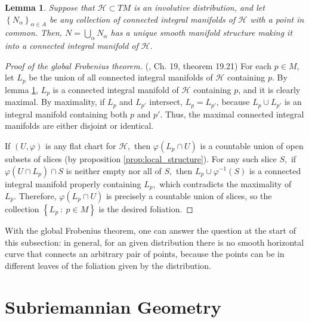 \documentclass[12pt, letterpaper, reqno]{amsart}
\theoremstyle{definition}
\theoremstyle{plain}
\newtheorem{lm}{Lemma}
\theoremstyle{remark}
\begin{document}
\begin{lm}\label{lm:man_struct}
	Suppose that $ \mathcal{H}\subset TM $ is an involutive distribution, and let $ \left\{ N_\alpha \right\}_{\alpha\in A} $ be any collection of connected integral manifolds of $ \mathcal{H} $ with a point in common. Then, $ N=\bigcup_{\alpha} N_\alpha $ has a unique smooth manifold structure making it into a connected integral manifold of $ \mathcal{H}. $  
\end{lm}

\begin{proof}[Proof of the global Frobenius theorem]
	(\cite{lee2003introduction}, Ch. 19, theorem 19.21) For each $ p\in M $, let $ L_p $ be the union of all connected integral manifolds of $ \mathcal{H} $ containing $ p. $ By lemma \ref{lm:man_struct}, $ L_p $ is a connected integral manifold of $ \mathcal{H} $ containing $ p $, and it is clearly maximal. By maximality, if $ L_p $ and $ L_{p'} $ intersect, $ L_p=L_{p'} $, because $ L_p\cup L_{p'} $ is an integral manifold containing both $ p $ and $ p' $. Thus, the maximal connected integral manifolds are either disjoint or identical.    

	If $ (U,\varphi) $ is any flat chart for $ \mathcal{H}, $ then $ \varphi(L_p\cap U) $ is a countable union of open subsets of slices (by proposition \ref{prop:local_structure}). For any such slice $ S, $ if $ \varphi(U\cap L_p)\cap S $ is neither empty nor all of $ S, $ then $ L_p\cup \varphi^{-1}(S )$ is a connected integral manifold properly containing $ L_p, $ which contradicts the maximality of $ L_p. $ Therefore, $ \varphi(L_p\cap U) $ is precisely a countable union of slices, so the collection $ \left\{ L_p\ : \ p\in M \right\} $ is the desired foliation.
\end{proof}

With the global Frobenius theorem, one can answer the question at the start of this subsection: in general, for an given distribution there is no smooth horizontal curve that connects an arbitrary pair of points, because the points can be in different leaves of the foliation given by the distribution.


\section{Subriemannian Geometry}%
\label{sec:subriemannian_geometry}
\end{document}
